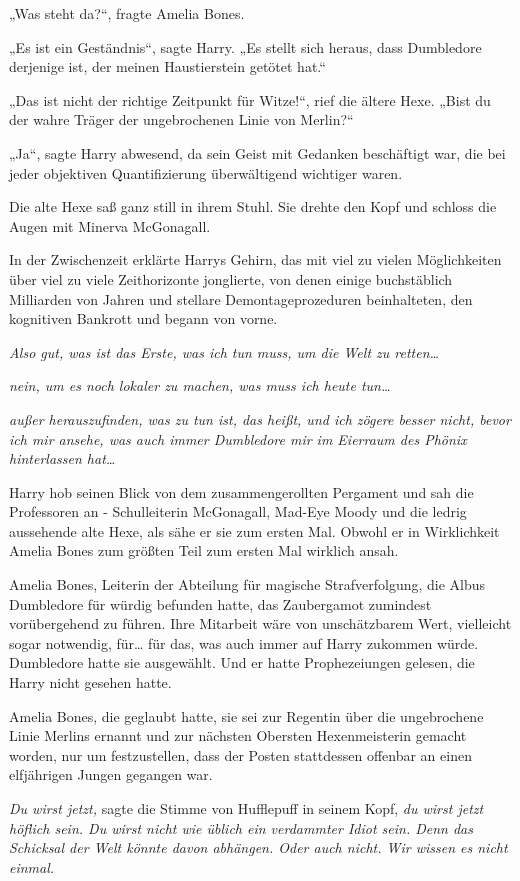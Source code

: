 {„Was steht da?“, fragte Amelia Bones.

„Es ist ein Geständnis“, sagte Harry. „Es stellt sich heraus, dass Dumbledore derjenige ist, der meinen Haustierstein getötet hat.“

„Das ist nicht der richtige Zeitpunkt für Witze!“, rief die ältere Hexe. „Bist du der wahre Träger der ungebrochenen Linie von Merlin?“

„Ja“, sagte Harry abwesend, da sein Geist mit Gedanken beschäftigt war, die bei jeder objektiven Quantifizierung überwältigend wichtiger waren.

Die alte Hexe saß ganz still in ihrem Stuhl. Sie drehte den Kopf und schloss die Augen mit Minerva McGonagall.

In der Zwischenzeit erklärte Harrys Gehirn, das mit viel zu vielen Möglichkeiten über viel zu viele Zeithorizonte jonglierte, von denen einige buchstäblich Milliarden von Jahren und stellare Demontageprozeduren beinhalteten, den kognitiven Bankrott und begann von vorne.

\emph{Also gut, was ist das Erste, was ich tun muss, um die Welt zu retten…}

\emph{nein, um es noch lokaler zu machen, was muss ich heute tun…}

\emph{außer herauszufinden, was zu tun ist, das heißt, und ich zögere besser nicht, bevor ich mir ansehe, was auch immer Dumbledore mir im Eierraum des Phönix hinterlassen hat…}

Harry hob seinen Blick von dem zusammengerollten Pergament und sah die Professoren an - Schulleiterin McGonagall, Mad-Eye Moody und die ledrig aussehende alte Hexe, als sähe er sie zum ersten Mal. Obwohl er in Wirklichkeit Amelia Bones zum größten Teil zum ersten Mal wirklich ansah.

Amelia Bones, Leiterin der Abteilung für magische Strafverfolgung, die Albus Dumbledore für würdig befunden hatte, das Zaubergamot zumindest vorübergehend zu führen. Ihre Mitarbeit wäre von unschätzbarem Wert, vielleicht sogar notwendig, für… für das, was auch immer auf Harry zukommen würde. Dumbledore hatte sie ausgewählt. Und er hatte Prophezeiungen gelesen, die Harry nicht gesehen hatte.

Amelia Bones, die geglaubt hatte, sie sei zur Regentin über die ungebrochene Linie Merlins ernannt und zur nächsten Obersten Hexenmeisterin gemacht worden, nur um festzustellen, dass der Posten stattdessen offenbar an einen elfjährigen Jungen gegangen war.

\emph{Du wirst jetzt,} sagte die Stimme von Hufflepuff in seinem Kopf, \emph{du wirst jetzt höflich sein. Du wirst nicht wie üblich ein verdammter Idiot sein. Denn das Schicksal der Welt könnte davon abhängen. Oder auch nicht. Wir wissen es nicht einmal.}

}

